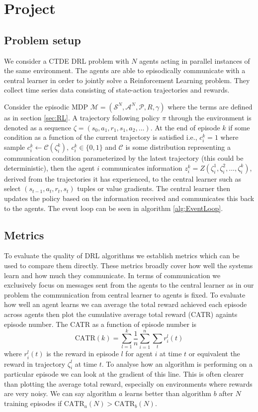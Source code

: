 \chapter{Project}

\section{Problem setup}

We consider a CTDE DRL problem with $N$ agents acting in parallel instances of the same environment.
The agents are able to episodically communicate with a central learner in order to jointly solve a Reinforcement Learning problem.
They collect time series data consisting of state-action trajectories and rewards.

Consider the episodic MDP $\mathcal{M}= (\mathcal{S}^N, \mathcal{A}^N, \mathcal{P}, R,\gamma)$ where the terms are defined as in section \ref{sec:RL}.
A trajectory following policy $\pi$ through the environment is denoted as a sequence $\zeta = (s_0, a_1, r_1, s_1, a_2, \dots)$.
At the end of episode $k$ if some condition as a function of the current trajectory is satisfied i.e., $c^k_i=1$ where sample $c^k_i \leftarrow \mathcal{C}(\zeta^k_i), \ c^k_i \in \{0,1\}$ and $\mathcal{C}$ is some distribution representing a communication condition parameterized by the latest trajectory (this could be deterministic), then the agent $i$ communicates information $z^k_i=Z(\zeta^1_i,\zeta^2_i,\dots, \zeta^k_i)$, derived from the trajectories it has experienced, to the central learner such as select $(s_{t-1},a_t,r_t,s_t)$ tuples or value gradients.
The central learner then updates the policy based on the information received and communicates this back to the agents. 
The event loop can be seen in algorithm \ref{alg:EventLoop}.

\section{Metrics}
To evaluate the quality of DRL algorithms we establish metrics which can be used to compare them directly. These metrics broadly cover how well the systems learn and how much they communicate. In terms of communication we exclusively focus on messages sent from the agents to the central learner as in our problem the communication from central learner to agents is fixed. To evaluate how well an agent learns we can average the total reward achieved each episode across agents then plot the cumulative average total reward (CATR) againts episode number. The CATR as a function of episode number is 
\begin{equation*}
    \text{CATR}(k) = \sum_{l=1}^k \frac{1}{n} \sum_{i=1}^n \sum_{t} r^l_i(t)
\end{equation*}
where $r^l_i(t)$ is the reward in episode $l$ for agent $i$ at time $t$ or equivalent the reward in trajectory $\zeta^l_i$ at time $t$.
To analyse how an algorithm is performing on a particular episode we can look at the gradient of this line.
This is often clearer than plotting the average total reward, especially on environments where rewards are very noisy.
We can say algorithm $a$ learns better than algorithm $b$ after $N$ training episodes if $\text{CATR}_a(N) > \text{CATR}_b(N)$.


